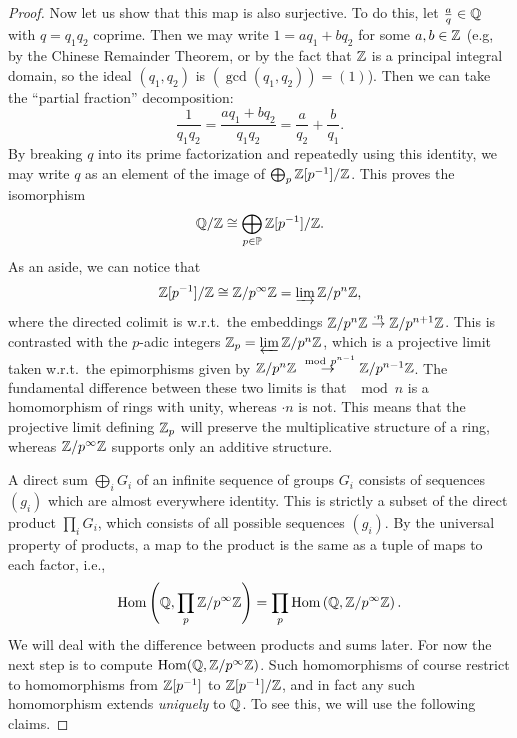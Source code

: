 \begin{proof}
    Now let us show that this map is also surjective. To do this, let $\frac aq\in\mathbb{Q}$ with $q=q_1q_2$ coprime. Then we may write $1=aq_1+bq_2$ for some $a,b\in\mathbb{Z}$ (e.g, by the Chinese Remainder Theorem, or by the fact that $\mathbb{Z}$ is a principal integral domain, so the ideal $(q_1,q_2)$ is $(\gcd(q_1,q_2))=(1)$). Then we can take the ``partial fraction'' decomposition:
    \[\frac{1}{q_1q_2}=\frac{aq_1+bq_2}{q_1q_2}=\frac{a}{q_2}+\frac{b}{q_1}.\]
    By breaking $q$ into its prime factorization and repeatedly using this identity, we may write $q$ as an element of the image of $\bigoplus_p \mathbb{Z}[p^{-1}]\slash\mathbb{Z}$. This proves the isomorphism 
    \[\mathbb{Q}\slash \mathbb{Z}\cong \bigoplus_{p\in\mathbb{P}}\mathbb{Z}[p^{-1}]\slash\mathbb{Z}.\]
    As an aside, we can notice that 
    \[\mathbb{Z}[p^{-1}]\slash\mathbb{Z}\cong \mathbb{Z}\slash p^\infty\mathbb{Z}=\varinjlim \mathbb{Z}\slash p^n\mathbb{Z},\]
    where the directed colimit is w.r.t.\ the embeddings $\mathbb{Z}\slash p^n\mathbb{Z}\overset{\cdot n}{\to} \mathbb{Z}\slash p^{n+1}\mathbb{Z}$. This is contrasted with the $p$-adic integers $\mathbb{Z}_p=\varprojlim \mathbb{Z}\slash p^n\mathbb{Z}$, which is a projective limit taken w.r.t.\ the epimorphisms given by $\mathbb{Z}\slash p^n\mathbb{Z}\overset{\ \mathrm{mod}\  p^{n-1}}{\to} \mathbb{Z}\slash p^{n-1}\mathbb{Z}$. The fundamental difference between these two limits is that $\mod n$ is a homomorphism of rings with unity, whereas $\cdot n$ is not. This means that the projective limit defining $\mathbb{Z}_p$ will preserve the multiplicative structure of a ring, whereas $\mathbb{Z}\slash p^\infty\mathbb{Z}$ supports only an additive structure.

    A direct sum $\bigoplus_i G_i$ of an infinite sequence of groups $G_i$ consists of sequences $(g_i)$ which are almost everywhere identity. This is strictly a subset of the direct product $\prod_i G_i$, which consists of all possible sequences $(g_i)$. By the universal property of products, a map to the product is the same as a tuple of maps to each factor, i.e., 
    \[\operatorname{Hom}\left(\mathbb{Q},\prod_p \mathbb{Z}\slash p^\infty\mathbb{Z}\right)=\prod_p \operatorname{Hom}\left(\mathbb{Q},\mathbb{Z}\slash p^\infty\mathbb{Z}\right).\]
    We will deal with the difference between products and sums later. For now the next step is to compute $\operatorname{Hom}(\mathbb{Q},\mathbb{Z}\slash p^{\infty}\mathbb{Z})$.  Such homomorphisms of course restrict to homomorphisms from $\mathbb{Z}[p^{-1}]$ to $\mathbb{Z}[p^{-1}]\slash \mathbb{Z}$, and in fact any such homomorphism extends \emph{uniquely} to $\mathbb{Q}$. To see this, we will use the following claims.


\end{proof}
